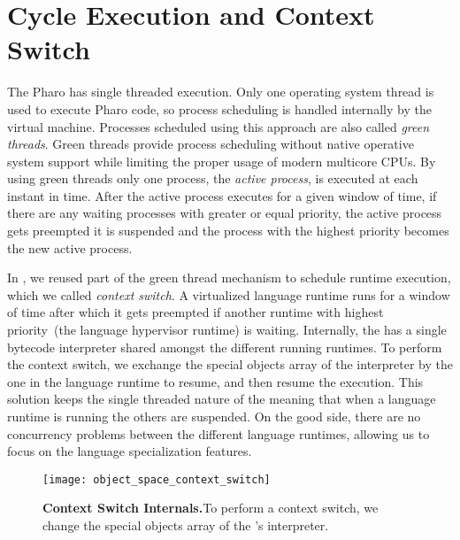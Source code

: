 
\section{Cycle Execution and Context Switch} \label{sec:context_switch}

The Pharo \VM has single threaded execution. Only one operating system thread is used to execute Pharo code, so process scheduling is handled internally by the virtual machine. Processes scheduled using this approach are also called \emph{green threads}. Green threads provide process scheduling without native operative system support while limiting the proper usage of modern multicore CPUs. By using green threads only one process, the \emph{active process}, is executed at each instant in time. After the active process executes for a given window of time, if there are any waiting processes with greater or equal priority, the active process gets preempted \ie it is suspended and the process with the highest priority becomes the new active process.

In \Vtt, we reused part of the green thread mechanism to schedule runtime execution, which we called \emph{context switch}. A virtualized language runtime runs for a window of time after which it gets preempted if another runtime with highest priority~(the language hypervisor runtime) is waiting. Internally, the \VM has a single bytecode interpreter shared amongst the different running runtimes. To perform the context switch, we exchange the special objects array of the \VM interpreter by the one in the language runtime to resume, and then resume the \VM execution. This solution keeps the single threaded nature of the \VM meaning that when a language runtime is running the others are suspended. On the good side, there are no concurrency problems between the different language runtimes, allowing us to focus on the language specialization features.


\begin{figure*}[htb]
\begin{center}
\texttt{[image: object\_space\_context\_switch]}
\caption{\textbf{Context Switch Internals.}To perform a context switch, we change the special objects array of the \VM's interpreter.\label{fig:context_switch}}
\end{center}
\end{figure*}


